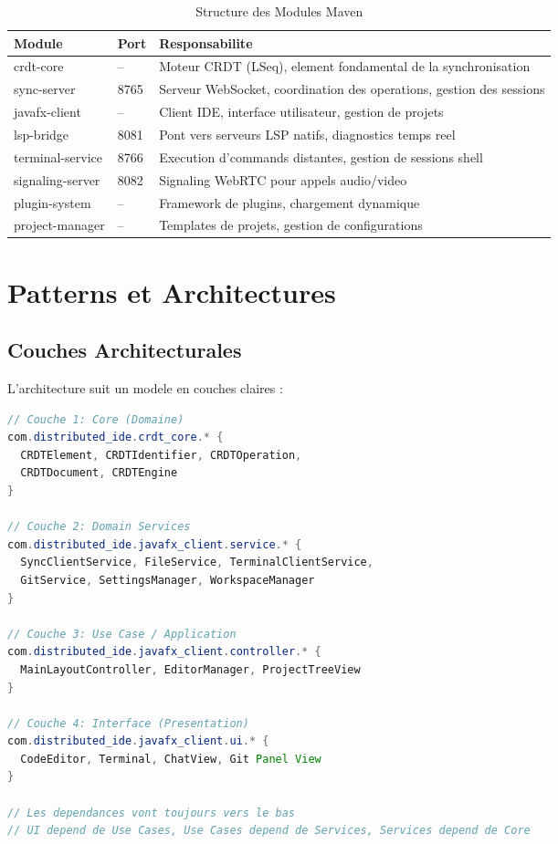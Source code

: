 \documentclass[11pt,a4paper,hidelinks]{book}
\begin{document}
\begin{table}[H]
\centering
\caption{Structure des Modules Maven}
\begin{tabularx}{\textwidth}{l l X}
\toprule
\textbf{Module} & \textbf{Port} & \textbf{Responsabilite} \\
\midrule
crdt-core & -- & Moteur CRDT (LSeq), element fondamental de la synchronisation \\
sync-server & 8765 & Serveur WebSocket, coordination des operations, gestion des sessions \\
javafx-client & -- & Client IDE, interface utilisateur, gestion de projets \\
lsp-bridge & 8081 & Pont vers serveurs LSP natifs, diagnostics temps reel \\
terminal-service & 8766 & Execution d'commands distantes, gestion de sessions shell \\
signaling-server & 8082 & Signaling WebRTC pour appels audio/video \\
plugin-system & -- & Framework de plugins, chargement dynamique \\
project-manager & -- & Templates de projets, gestion de configurations \\
\bottomrule
\end{tabularx}
\end{table}

\section{Patterns et Architectures}

\subsection{Couches Architecturales}

L'architecture suit un modele en couches claires :

\begin{lstlisting}[language=Java, caption={Struct Architecture - Dependances Unidirectionnelles}]
// Couche 1: Core (Domaine)
com.distributed_ide.crdt_core.* {
  CRDTElement, CRDTIdentifier, CRDTOperation,
  CRDTDocument, CRDTEngine
}

// Couche 2: Domain Services
com.distributed_ide.javafx_client.service.* {
  SyncClientService, FileService, TerminalClientService,
  GitService, SettingsManager, WorkspaceManager
}

// Couche 3: Use Case / Application
com.distributed_ide.javafx_client.controller.* {
  MainLayoutController, EditorManager, ProjectTreeView
}

// Couche 4: Interface (Presentation)
com.distributed_ide.javafx_client.ui.* {
  CodeEditor, Terminal, ChatView, Git Panel View
}

// Les dependances vont toujours vers le bas
// UI depend de Use Cases, Use Cases depend de Services, Services depend de Core
\end{lstlisting}
\end{document}
